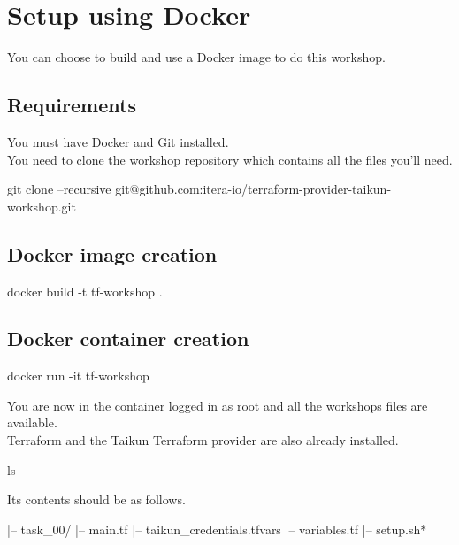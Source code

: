 \section{Setup using Docker}\label{sec:docker}

You can choose to build and use a Docker image to do this workshop.

\subsection{Requirements}

You must have Docker and Git installed.\\
You need to clone the workshop repository which contains all the files you'll need.

\begin{shell}
git clone --recursive git@github.com:itera-io/terraform-provider-taikun-workshop.git
\end{shell}

\subsection{Docker image creation}

\begin{shell}
docker build -t tf-workshop .
\end{shell}

\subsection{Docker container creation}

\begin{shell}
docker run -it tf-workshop
\end{shell}
You are now in the container logged in as root and all the workshops files are available.\\
Terraform and the Taikun Terraform provider are also already installed.

\begin{shell}
ls
\end{shell}
Its contents should be as follows.
\begin{raw}
|-- task_00/
    |-- main.tf
    |-- taikun_credentials.tfvars
    |-- variables.tf
|-- setup.sh*
\end{raw}

